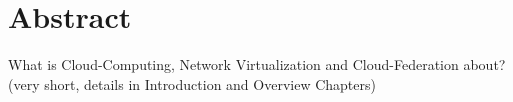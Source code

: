 \chapter{Abstract}

What is Cloud-Computing, Network Virtualization and Cloud-Federation about? (very short, details in Introduction and Overview Chapters)